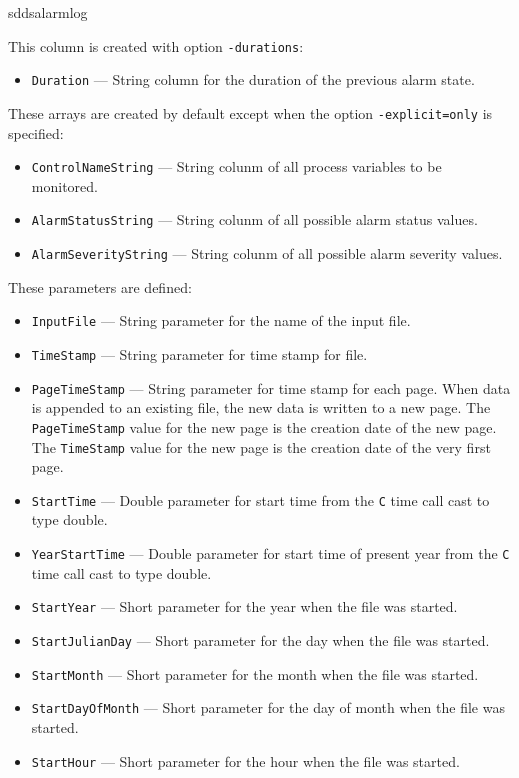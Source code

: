 \begin{sddsprog}{sddsalarmlog}
\begin{itemize}
This column is created with option {\tt -durations}:
\begin{itemize}
        \item {\tt Duration} --- String column for the duration of the previous alarm state.
\end{itemize}

These arrays are created by default except when the option {\tt -explicit=only} is specified:
\begin{itemize}
        \item {\tt ControlNameString} --- String colunm of all process variables to be monitored.
        \item {\tt AlarmStatusString} --- String colunm of all possible alarm status values.
        \item {\tt AlarmSeverityString} --- String colunm of all possible alarm severity values.
\end{itemize}

These parameters are defined:
\begin{itemize}
        \item {\tt InputFile} --- String parameter for the name of the input file.
        \item {\tt TimeStamp} --- String parameter for time stamp for file.
        \item {\tt PageTimeStamp} --- String parameter for time stamp for each page. When data
                is appended to an existing file, the new data is written to a new
                page. The {\tt PageTimeStamp} value for the new page is the creation
                date of the new page. The {\tt TimeStamp} value for the new page is the creation 
                date of the very first page.
        \item {\tt StartTime} --- Double parameter for start time from the {\tt C} time call cast to type double.
        \item {\tt YearStartTime} --- Double parameter for start time of present year from the {\tt C} time call cast to type double.
        \item {\verb+StartYear+} --- Short parameter for the year when the file was started.
        \item {\verb+StartJulianDay+} --- Short parameter for the day when the file was started.
        \item {\verb+StartMonth+} --- Short parameter for the month when the file was started.
        \item {\verb+StartDayOfMonth+} --- Short parameter for the day of month when the file was started.
        \item {\verb+StartHour+} --- Short parameter for the hour when the file was started.
\end{itemize}
\end{itemize} %



\end{sddsprog}
